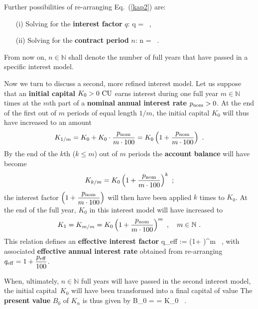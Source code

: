 \medskip
\noindent
Further possibilities of re-arranging Eq.~(\ref{kap2}) are:
%
\begin{itemize}
\item[(i)] Solving for the {\bf interest factor} $q$:
%
\be
q =  \ ,
\ee
%
\item[(ii)] Solving for the {\bf contract period} $n$:
%
\be
n =  \ .
\ee
%
\end{itemize}
%
{}From now on, $n \in \mathbb{N}$ shall denote the number of full years that have passed in a specific interest model.

\medskip
\noindent
Now we turn to discuss a second, more refined interest model. Let 
us suppose that an {\bf initial capital} $K_{0}>0~{\rm CU}$ earns 
interest during one full year $m \in \mathbb{N}$ times at the 
$m$th part of a {\bf nominal annual interest rate} $p_{\rm 
nom}>0$. At the end of the first out of $m$ periods of equal 
length $1/m$, the initial capital $K_{0}$ will thus have increased 
to an amount
%
\[
K_{1/m} = K_{0} + K_{0}\cdot\frac{p_{\rm nom}}{m\cdot 100}
= K_{0}\left(1+\frac{p_{\rm nom}}{m\cdot 100}\right) \ .
\]
%
By the end of the $k$th ($k \leq m$) out of $m$ periods the {\bf 
account balance} will have become
%
\[
K_{k/m} = K_{0}\left(1+\frac{p_{\rm nom}}{m\cdot 100}\right)^{k}
\ ;
\]
%
the interest factor $\displaystyle
\left(1+\frac{p_{\rm nom}}{m\cdot 100}\right)$ will then have been 
applied $k$ times to $K_{0}$. At the end of the full year, $K_{0}$ 
in this interest model will have increased to
%
\[
K_{1} = K_{m/m} = K_{0}\left(1+\frac{p_{\rm nom}}{m\cdot 100}
\right)^{m} \ , \quad
m \in \mathbb{N} \ .
\]
%
This relation defines an {\bf effective interest factor}
%
\be
{}
q_{\rm eff} := \left(1+
\right)^{m} \ ,
\ee
%
with associated {\bf effective annual interest rate}
%
\be
{}
\ee
%
obtained from re-arranging $\displaystyle q_{\rm 
eff}=1+\frac{p_{\rm eff}}{100}$.

\medskip
\noindent
When, ultimately, $n \in \mathbb{N}$ full years will have passed 
in the second interest model, the initial capital~$K_{0}$ will 
have been transformed into a final capital of value
%
\be
{}
\ee
%
The {\bf present value} $B_{0}$ of $K_{n}$ is thus given by
%
\be
B_{0} =  = K_{0} \ .
\ee
%

